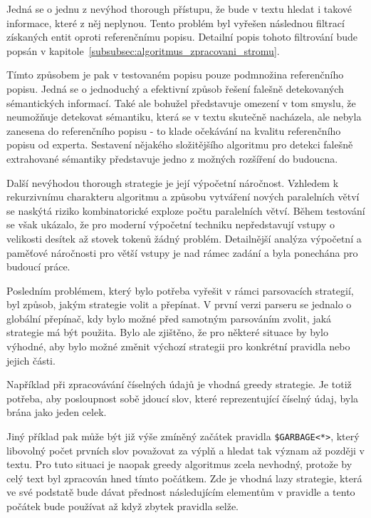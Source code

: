Jedná se o jednu z nevýhod thorough přístupu, že bude v textu hledat i takové informace, které z něj neplynou.
Tento problém byl vyřešen následnou filtrací získaných entit oproti referenčnímu popisu.
Detailní popis tohoto filtrování bude popsán v kapitole~\ref{subsubsec:algoritmus_zpracovani_stromu}.

Tímto způsobem je pak v testovaném popisu pouze podmnožina referenčního popisu.
Jedná se o jednoduchý a efektivní způsob řešení falešně detekovaných sémantických informací.
Také ale bohužel představuje omezení v tom smyslu, že neumožňuje detekovat sémantiku, která se v textu skutečně nacházela,
ale nebyla zanesena do referenčního popisu - to klade očekávání na kvalitu referenčního popisu od experta.
Sestavení nějakého složitějšího algoritmu pro detekci falešně extrahované sémantiky představuje jedno z možných rozšíření do budoucna.

Další nevýhodou thorough strategie je její výpočetní náročnost.
Vzhledem k rekurzivnímu charakteru algoritmu a způsobu vytváření nových paralelních větví
se naskýtá riziko kombinatorické exploze počtu paralelních větví.
Během testování se však ukázalo, že pro moderní výpočetní techniku nepředstavují vstupy o velikosti desítek až stovek tokenů žádný problém.
Detailnější analýza výpočetní a paměťové náročnosti pro větší vstupy je nad rámec zadání a byla ponechána pro budoucí práce.

Posledním problémem, který bylo potřeba vyřešit v rámci parsovacích strategií, byl způsob, jakým strategie volit a přepínat.
V první verzi parseru se jednalo o globální přepínač, kdy bylo možné před samotným parsováním zvolit, jaká strategie má být použita.
Bylo ale zjištěno, že pro některé situace by bylo výhodné, aby bylo možné změnit výchozí strategii pro konkrétní pravidla nebo jejich části.

Například při zpracovávání číselných údajů je vhodná greedy strategie.
Je totiž potřeba, aby posloupnost sobě jdoucí slov, které reprezentující číselný údaj, byla brána jako jeden celek.

Jiný příklad pak může být již výše zmíněný začátek pravidla \texttt{\$GARBAGE<*>},
který libovolný počet prvních slov považovat za výplň a hledat tak význam až později v textu.
Pro tuto situaci je naopak greedy algoritmus zcela nevhodný, protože by celý text byl zpracován hned tímto počátkem.
Zde je vhodná lazy strategie, která ve své podstatě bude dávat přednost následujícím elementům
v pravidle a tento počátek bude používat až když zbytek pravidla selže.

